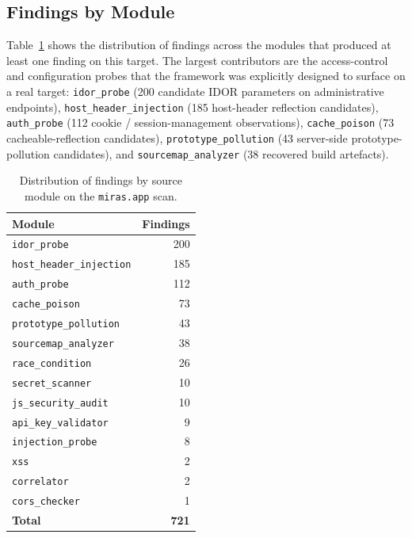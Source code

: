 \subsection{Findings by Module}

Table~\ref{tab:miras-by-module} shows the distribution of findings across the modules that produced at least one finding on this target. The largest contributors are the access-control and configuration probes that the framework was explicitly designed to surface on a real target: \texttt{idor\_probe} (200 candidate IDOR parameters on administrative endpoints), \texttt{host\_header\_injection} (185 host-header reflection candidates), \texttt{auth\_probe} (112 cookie / session-management observations), \texttt{cache\_poison} (73 cacheable-reflection candidates), \texttt{prototype\_pollution} (43 server-side prototype-pollution candidates), and \texttt{sourcemap\_analyzer} (38 recovered build artefacts).

\begin{table}[h]
\centering
\small
\begin{tabular}{|l|r|}
\hline
\textbf{Module} & \textbf{Findings} \\
\hline
\texttt{idor\_probe}            & 200 \\
\texttt{host\_header\_injection}& 185 \\
\texttt{auth\_probe}            & 112 \\
\texttt{cache\_poison}          & 73 \\
\texttt{prototype\_pollution}   & 43 \\
\texttt{sourcemap\_analyzer}    & 38 \\
\texttt{race\_condition}        & 26 \\
\texttt{secret\_scanner}        & 10 \\
\texttt{js\_security\_audit}    & 10 \\
\texttt{api\_key\_validator}    & 9 \\
\texttt{injection\_probe}       & 8 \\
\texttt{xss}                    & 2 \\
\texttt{correlator}             & 2 \\
\texttt{cors\_checker}          & 1 \\
\hline
\textbf{Total}                  & \textbf{721} \\
\hline
\end{tabular}
\caption{Distribution of findings by source module on the \texttt{miras.app} scan.}
\label{tab:miras-by-module}
\end{table}

